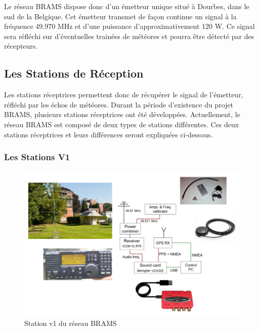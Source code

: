 \documentclass[11pt]{article}
\begin{document}
Le réseau BRAMS dispose donc d'un émetteur unique situé à Dourbes, dans le sud de la Belgique.
Cet émetteur transmet de façon continue un signal à la fréquence 49.970 MHz et d'une puissance d'approximativement 120 W.
Ce signal sera réfléchi sur d'éventuelles trainées de météores et pourra être détecté par des récepteurs.

\subsection{Les Stations de Réception}
Les stations réceptrices permettent donc de récupérer le signal de l'émetteur, réfléchi par les échos de météores.
Durant la période d'existence du projet BRAMS, plusieurs stations réceptrices ont été développées.
Actuellement, le réseau BRAMS est composé de deux types de stations différentes.
Ces deux stations réceptrices et leurs différences seront expliquées ci-dessous.

\subsubsection{Les Stations V1}

\begin{figure}[t]
    \begin{center}
        \includegraphics[scale=0.6]{Material_BRAMS_1.0.png}
        \caption{Station v1 du réseau BRAMS}
        \label{fig:station_icom}
    \end{center}
\end{figure}
\end{document}
